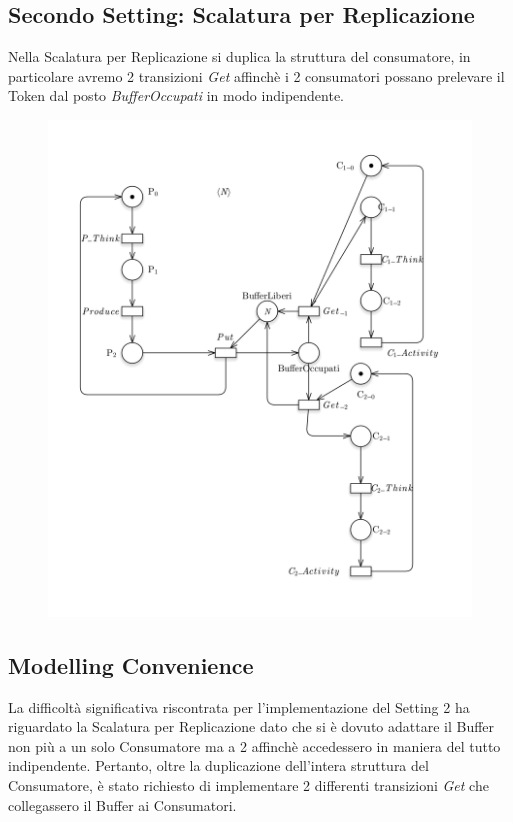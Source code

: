 \documentclass{article}
\begin{document}
\subsection{Secondo  Setting: Scalatura per Replicazione}
Nella Scalatura per Replicazione si duplica la struttura del consumatore, in particolare avremo 2 transizioni \textit{Get} affinchè i 2 consumatori possano prelevare il Token dal posto \textit{BufferOccupati} in modo indipendente.
\begin{figure}[h] 
\centering
\includegraphics[scale=0.4]{PT-Setting2 - Replicazione.png}
\end{figure}
\clearpage
\subsection{Modelling Convenience}
La difficoltà significativa riscontrata per l'implementazione del Setting 2 ha riguardato la Scalatura per Replicazione dato che si è dovuto adattare il Buffer non più a un solo Consumatore ma a 2 affinchè accedessero in maniera del tutto indipendente. Pertanto, oltre la duplicazione dell'intera struttura del Consumatore, è stato richiesto di implementare 2 differenti transizioni \textit{Get} che collegassero il Buffer ai Consumatori.
\end{document}
